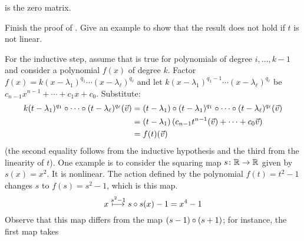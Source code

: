\begin{exercises}
\begin{answer}
\begin{exparts}
\begin{equation*}
         \end{equation*}
         is the zero matrix.
       \end{exparts} 
     \end{answer}
   \recommended \item \label{exer:PolyMapsFactor}
      \begin{exparts}
        \partsitem Finish the proof of .
        \partsitem Give an example to show that the result does not hold
          if $t$ is not linear.
      \end{exparts}
      \begin{answer}
        \begin{exparts}
          \partsitem
            For the inductive step, assume that 
            is true for polynomials
            of degree \( i,\ldots,k-1 \) and consider a polynomial \( f(x) \)
            of degree \( k \). 
            Factor $f(x)=k(x-\lambda_1)^{q_1}\cdots(x-\lambda_\ell)^{q_\ell}$
            and let
            \( k(x-\lambda_1)^{q_1-1}\cdots(x-\lambda_\ell)^{q_\ell} \)
            be \( c_{n-1}x^{n-1}+\cdots+c_1x+c_0 \).
            Substitute:
            \begin{align*}
               k(t-\lambda_1)^{q_1}\mathbin\circ \cdots\mathbin\circ 
                                            (t-\lambda_\ell)^{q_\ell}(\vec{v})
               &=
               (t-\lambda_1)\mathbin\circ 
                  (t-\lambda_1)^{q_1}\mathbin\circ \cdots\mathbin\circ 
                  (t-\lambda_\ell)^{q_\ell}
                          (\vec{v})    \\
               &=
               (t-\lambda_1)\,(c_{n-1}t^{n-1}(\vec{v})+\cdots+c_0\vec{v}) \\
               &=
               f(t)(\vec{v})
            \end{align*}
           (the second equality follows from the inductive hypothesis and 
           the third from the linearity of \( t \)).
         \partsitem One example is to consider the squaring map
            $\mbox{$s\colon \mathbb{R}\to \mathbb{R}$}$ given by $s(x)=x^2$.
            It is nonlinear.
            The action defined by the polynomial $f(t)=t^2-1$ 
            changes $s$ to $f(s)=s^2-1$, which is this map.
            \begin{equation*} 
              x\stackrel{s^2-1}{\longmapsto} s\mathbin\circ s(x)-1=x^4-1
            \end{equation*}
            Observe that this map differs from the map
            $(s-1)\mathbin\circ (s+1)$; for instance, the first map takes

\end{exparts}
\end{answer}
\end{exercises}

